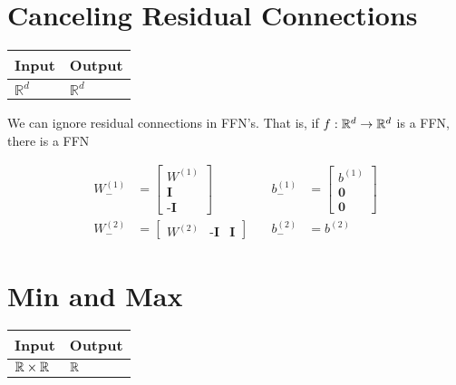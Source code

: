\section{Canceling Residual Connections}

    \begin{tabular}{|p{1.5cm}|p{1.5cm}|}
        \hline
        \rowcolor{orange!20} %
        \textbf{Input} & \textbf{Output} \\
        \hline
        $\mathbb{R}^d$ & $\mathbb{R}^d$ \\
        \hline
    \end{tabular}

    We can ignore residual connections in FFN's. That is, if $f:\mathbb{R}^d\to \mathbb{R}^d$ is a FFN, there is a FFN 

    \begin{align*}
        W_-^{(1)}&=\begin{bmatrix}
            W^{(1)}\\
            \textbf{I}\\
            \textbf{-I}
        \end{bmatrix}  &\quad b_-^{(1)}&=\begin{bmatrix}
            b^{(1)}\\
            \textbf{0}\\
            \textbf{0}
        \end{bmatrix}\\
        W_-^{(2)}&=\begin{bmatrix}
            W^{(2)}& \textbf{-I} & \textbf{I}
        \end{bmatrix}
        & \quad b_-^{(2)} &= b^{(2)}
    \end{align*}


\section{Min and Max}
    \begin{tabular}{|p{1.5cm}|p{1.5cm}|}
        \hline
        \rowcolor{orange!20} %
        \textbf{Input} & \textbf{Output} \\
        \hline
        $\mathbb{R}\times\mathbb{R}$ & $\mathbb{R}$ \\
        \hline
    \end{tabular}

